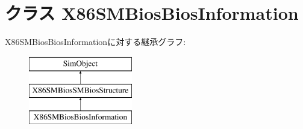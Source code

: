 \hypertarget{classSMBios_1_1X86SMBiosBiosInformation}{
\section{クラス X86SMBiosBiosInformation}
\label{classSMBios_1_1X86SMBiosBiosInformation}
}
X86SMBiosBiosInformationに対する継承グラフ:\begin{figure}[H]
\begin{center}
\leavevmode
\includegraphics[height=3cm]{classSMBios_1_1X86SMBiosBiosInformation}
\end{center}
\end{figure}
